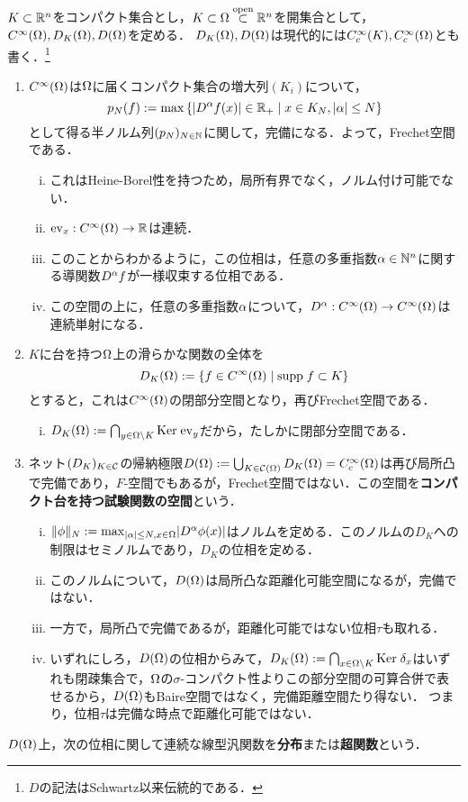 \documentclass[uplatex,dvipdfmx]{jsreport}
\begin{document}
\begin{example}[滑らかな関数の空間と試験関数の空間]
    $K\subset\mathbb{R}^n$をコンパクト集合とし，$K\subset\Omega\overset{\mathrm{open}}{\subset}\mathbb{R}^n$を開集合として，$C^\infty(\Omega),D_K(\Omega),D(\Omega)$を定める．
    $D_K(\Omega),D(\Omega)$は現代的には$C_c^\infty(K),C_c^\infty(\Omega)$とも書く．\footnote{$D$の記法はSchwartz以来伝統的である．}
    \begin{enumerate}
        \item  $C^\infty(\Omega)$は$\Omega$に届くコンパクト集合の増大列$(K_i)$について，
        \[p_N(f):=\max\left\{\lvert D^\alpha f(x)\rvert\in\mathbb{R}_+\mid x\in K_N,\lvert\alpha\rvert\le N\right\}\]
        として得る半ノルム列$(p_N)_{N\in\mathbb{N}}$に関して，完備になる．よって，Frechet空間である．
        \begin{enumerate}[(i)]
            \item これはHeine-Borel性を持つため，局所有界でなく，ノルム付け可能でない．
            \item $\mathrm{ev}_x:C^\infty(\Omega)\to\mathbb{R}$は連続．
            \item このことからわかるように，この位相は，任意の多重指数$\alpha\in\mathbb{N}^n$に関する導関数$D^\alpha f$が一様収束する位相である．
            \item この空間の上に，任意の多重指数$\alpha$について，$D^\alpha:C^\infty(\Omega)\to C^\infty(\Omega)$は連続単射になる．
        \end{enumerate}
        \item $K$に台を持つ$\Omega$上の滑らかな関数の全体を
        \[D_K(\Omega):=\left\{f\in C^\infty(\Omega)\mid \mathrm{supp}\; f\subset K\right\}\]
        とすると，これは$C^\infty(\Omega)$の閉部分空間となり，再びFrechet空間である．
        \begin{enumerate}[(i)]
            \item $D_K(\Omega):=\bigcap_{y\in\Omega\setminus K}\mathrm{Ker}\;\mathrm{ev}_y$だから，たしかに閉部分空間である．
        \end{enumerate}
        \item ネット$(D_K)_{K\in\mathcal{C}}$の帰納極限$D(\Omega):=\bigcup_{K\in\mathcal{C}(\Omega)}D_K(\Omega)=C_c^\infty(\Omega)$は再び局所凸で完備であり，$F$-空間でもあるが，Frechet空間ではない．この空間を\textbf{コンパクト台を持つ試験関数の空間}という．
        \begin{enumerate}[(i)]
            \item $\|\phi\|_N:=\max_{\lvert\alpha\rvert\le N,x\in\Omega}\lvert D^\alpha\phi(x)\rvert$はノルムを定める．このノルムの$D_K$への制限はセミノルムであり，$D_K$の位相を定める．
            \item このノルムについて，$D(\Omega)$は局所凸な距離化可能空間になるが，完備ではない．
            \item 一方で，局所凸で完備であるが，距離化可能ではない位相$\tau$も取れる．
            \item いずれにしろ，$D(\Omega)$の位相からみて，$D_K(\Omega):=\bigcap_{x\in\Omega\setminus K}\mathrm{Ker}\;\delta_x$はいずれも閉疎集合で，$\Omega$の$\sigma$-コンパクト性よりこの部分空間の可算合併で表せるから，$D(\Omega)$もBaire空間ではなく，完備距離空間たり得ない．
            つまり，位相$\tau$は完備な時点で距離化可能ではない．
        \end{enumerate}
    \end{enumerate}
    $D(\Omega)$上，次の位相に関して連続な線型汎関数を\textbf{分布}または\textbf{超関数}という．
\end{example}
\end{document}

